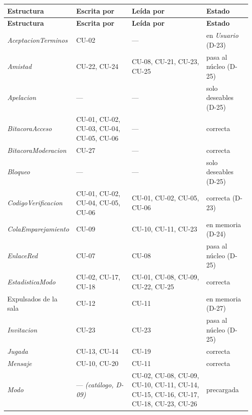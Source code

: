 \begin{center}\small
\begin{longtable}{|L{0.215\textwidth}|L{0.26\textwidth}|L{0.235\textwidth}|L{0.15\textwidth}|}
\hline
\textbf{Estructura} & \textbf{Escrita por} & \textbf{Leída por} & \textbf{Estado} \\ \hline
\endfirsthead
\hline
\textbf{Estructura} & \textbf{Escrita por} & \textbf{Leída por} & \textbf{Estado} \\ \hline
\endhead
\textit{AceptacionTerminos} & \mbox{CU-02} & — & en \textit{Usuario} (\mbox{D-23}) \\ \hline
\textit{Amistad} & \mbox{CU-22}, \mbox{CU-24} & \mbox{CU-08}, \mbox{CU-21}, \mbox{CU-23}, \mbox{CU-25} & pasa al núcleo (\mbox{D-25}) \\ \hline
\textit{Apelacion} & — & — & solo deseables (\mbox{D-25}) \\ \hline
\textit{BitacoraAcceso} & \mbox{CU-01}, \mbox{CU-02}, \mbox{CU-03}, \mbox{CU-04}, \mbox{CU-05}, \mbox{CU-06} & — & correcta \\ \hline
\textit{BitacoraModeracion} & \mbox{CU-27} & — & correcta \\ \hline
\textit{Bloqueo} & — & — & solo deseables (\mbox{D-25}) \\ \hline
\textit{CodigoVerificacion} & \mbox{CU-01}, \mbox{CU-02}, \mbox{CU-04}, \mbox{CU-05}, \mbox{CU-06} & \mbox{CU-01}, \mbox{CU-02}, \mbox{CU-05}, \mbox{CU-06} & correcta (\mbox{D-23}) \\ \hline
\textit{ColaEmparejamiento} & \mbox{CU-09} & \mbox{CU-10}, \mbox{CU-11}, \mbox{CU-23} & en memoria (\mbox{D-24}) \\ \hline
\textit{EnlaceRed} & \mbox{CU-07} & \mbox{CU-08} & pasa al núcleo (\mbox{D-25}) \\ \hline
\textit{EstadisticaModo} & \mbox{CU-02}, \mbox{CU-17}, \mbox{CU-18} & \mbox{CU-01}, \mbox{CU-08}, \mbox{CU-09}, \mbox{CU-22}, \mbox{CU-25} & correcta \\ \hline
Expulsados de la sala & \mbox{CU-12} & \mbox{CU-11} & en memoria (\mbox{D-27}) \\ \hline
\textit{Invitacion} & \mbox{CU-23} & \mbox{CU-23} & pasa al núcleo (\mbox{D-25}) \\ \hline
\textit{Jugada} & \mbox{CU-13}, \mbox{CU-14} & \mbox{CU-19} & correcta \\ \hline
\textit{Mensaje} & \mbox{CU-10}, \mbox{CU-20} & \mbox{CU-11} & correcta \\ \hline
\textit{Modo} & — \textit{(catálogo, \mbox{D-09})} & \mbox{CU-02}, \mbox{CU-08}, \mbox{CU-09}, \mbox{CU-10}, \mbox{CU-11}, \mbox{CU-14}, \mbox{CU-15}, \mbox{CU-16}, \mbox{CU-17}, \mbox{CU-18}, \mbox{CU-23}, \mbox{CU-26} & precargada \\ \hline

\end{longtable}
\end{center}

